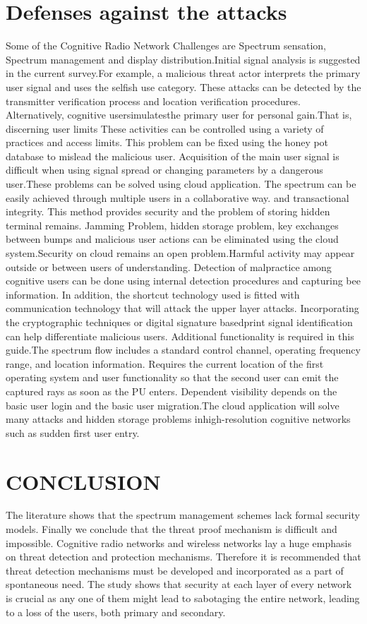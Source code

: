 \documentclass{article}
\begin{document}
\section{ Defenses against the attacks}
Some of the Cognitive Radio Network Challenges are
Spectrum sensation, Spectrum management and display
distribution.Initial signal analysis is suggested in the current
survey.For example, a malicious threat actor interprets the
primary user signal and uses the selfish use category. These
attacks can be detected by the transmitter verification
process and location verification procedures. Alternatively,
cognitive usersimulatesthe primary user for personal
gain.That is, discerning user limits These activities can be
controlled using a variety of practices and access limits.
This problem can be fixed using the honey pot database to
mislead the malicious user.
Acquisition of the main user signal is difficult when using
signal spread or changing parameters by a dangerous
user.These problems can be solved using cloud application.
The spectrum can be easily achieved through multiple users
in a collaborative way. and transactional integrity. This
method provides security and the problem of storing hidden
terminal remains. Jamming Problem, hidden storage
problem, key exchanges between bumps and malicious user
actions can be eliminated using the cloud system.Security
on cloud remains an open problem.Harmful activity may
appear outside or between users of understanding. Detection
of malpractice among cognitive users can be done using
internal detection procedures and capturing bee information.
In addition, the shortcut technology used is fitted with
communication technology that will attack the upper layer
attacks. Incorporating the cryptographic techniques or
digital signature basedprint signal identification can help
differentiate malicious users. Additional functionality is
required in this guide.The spectrum flow includes a
standard control channel, operating frequency range, and
location information. Requires the current location of the
first operating system and user functionality so that the
second user can emit the captured rays as soon as the PU
enters. Dependent visibility depends on the basic user login
and the basic user migration.The cloud application will
solve many attacks and hidden storage problems inhigh-resolution cognitive networks such as sudden first user
entry.
\newline
\section{CONCLUSION}
The literature shows that the spectrum management
schemes lack formal security models. Finally we conclude
that the threat proof mechanism is difficult and impossible.
Cognitive radio networks and wireless networks lay a huge
emphasis on threat detection and protection mechanisms.
Therefore it is recommended that threat detection
mechanisms must be developed and incorporated as a part
of spontaneous need. The study shows that security at each
layer of every network is crucial as any one of them might
lead to sabotaging the entire network, leading to a loss of
the users, both primary and secondary.
\newline
\end{document}
